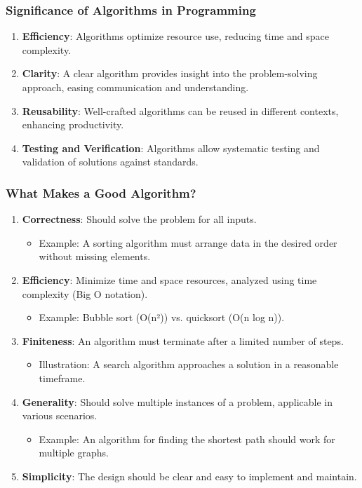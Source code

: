 \documentclass{beamer}
\begin{document}
\begin{frame}[fragile]
    \frametitle{Significance of Algorithms in Programming}
    \begin{enumerate}
        \item \textbf{Efficiency}: Algorithms optimize resource use, reducing time and space complexity.
        \item \textbf{Clarity}: A clear algorithm provides insight into the problem-solving approach, easing communication and understanding.
        \item \textbf{Reusability}: Well-crafted algorithms can be reused in different contexts, enhancing productivity.
        \item \textbf{Testing and Verification}: Algorithms allow systematic testing and validation of solutions against standards.
    \end{enumerate}
\end{frame}

\begin{frame}[fragile]
    \frametitle{What Makes a Good Algorithm?}
    \begin{enumerate}
        \item \textbf{Correctness}: Should solve the problem for all inputs.
            \begin{itemize}
                \item Example: A sorting algorithm must arrange data in the desired order without missing elements.
            \end{itemize}
        \item \textbf{Efficiency}: Minimize time and space resources, analyzed using time complexity (Big O notation).
            \begin{itemize}
                \item Example: Bubble sort (O(n²)) vs. quicksort (O(n log n)).
            \end{itemize}
        \item \textbf{Finiteness}: An algorithm must terminate after a limited number of steps.
            \begin{itemize}
                \item Illustration: A search algorithm approaches a solution in a reasonable timeframe.
            \end{itemize}
        \item \textbf{Generality}: Should solve multiple instances of a problem, applicable in various scenarios.
            \begin{itemize}
                \item Example: An algorithm for finding the shortest path should work for multiple graphs.
            \end{itemize}
        \item \textbf{Simplicity}: The design should be clear and easy to implement and maintain.
    \end{enumerate}
\end{frame}
\end{document}
